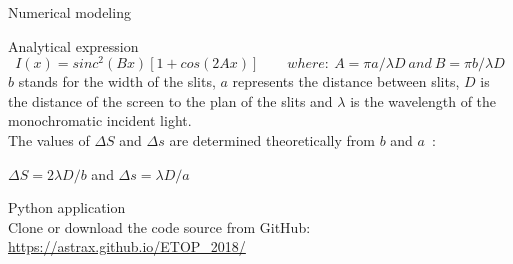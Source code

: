 \documentclass[9pt]{beamer}
\begin{document}
\begin{frame}{Numerical modeling}
\begin{block}{Analytical expression}
	\begin{equation*}
	I(x) = sinc^2 (Bx)[1+cos(2Ax)] \quad \quad where: \ A = \pi a /\lambda D \ and \ B = \pi b / \lambda D
	\end{equation*}
	$b$ stands for the width of the slits, $a$ represents the distance between slits, $D$ is the distance of the screen to the plan of the slits and $\lambda$ is the wavelength of the monochromatic incident light.\\
	The values of $\Delta S$ and $\Delta s$ are determined theoretically from $b$ and $a$ :\\
	\begin{center}
		$\Delta S=2\lambda D/b$	\quad and \quad $\Delta s=\lambda D/a$
	\end{center}

\end{block}


\end{frame}

\begin{frame}{Python application}
	\centering
	\\
	Clone or download the code source from GitHub:\\
	\url{https://astrax.github.io/ETOP_2018/}	
\end{frame}

\end{document}
